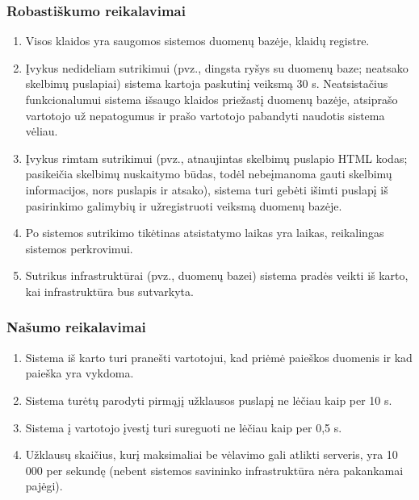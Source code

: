 \documentclass[12pt]{article}
\begin{document}
	\subsubsection{Robastiškumo reikalavimai}
	\begin{enumerate}
		\item Visos klaidos yra saugomos sistemos duomenų bazėje, klaidų registre.
		\item Įvykus nedideliam sutrikimui (pvz., dingsta ryšys su duomenų baze; neatsako skelbimų puslapiai) sistema kartoja paskutinį veiksmą 30 s. Neatsistačius funkcionalumui sistema išsaugo klaidos priežastį duomenų bazėje, atsiprašo vartotojo už nepatogumus ir prašo vartotojo pabandyti naudotis sistema vėliau.
		\item Įvykus rimtam sutrikimui (pvz., atnaujintas skelbimų puslapio HTML kodas; pasikeičia skelbimų nuskaitymo būdas, todėl nebeįmanoma gauti skelbimų informacijos, nors puslapis ir atsako), sistema turi gebėti išimti puslapį iš pasirinkimo galimybių ir užregistruoti veiksmą duomenų bazėje.
		\item Po sistemos sutrikimo tikėtinas atsistatymo laikas yra laikas, reikalingas sistemos perkrovimui.
		\item Sutrikus infrastruktūrai (pvz., duomenų bazei) sistema pradės veikti iš karto, kai infrastruktūra bus sutvarkyta.
	\end{enumerate}	
	
	\subsubsection{Našumo reikalavimai}
	\begin{enumerate}
		\item Sistema iš karto turi pranešti vartotojui, kad priėmė paieškos duomenis ir kad paieška yra vykdoma.
		\item Sistema turėtų parodyti pirmąjį užklausos puslapį ne lėčiau kaip per 10 s.
		\item Sistema į vartotojo įvestį turi sureguoti ne lėčiau kaip per 0,5 s.
		\item Užklausų skaičius, kurį maksimaliai be vėlavimo gali atlikti serveris, yra 10 000 per sekundę (nebent sistemos savininko infrastruktūra nėra pakankamai pajėgi).
	\end{enumerate}
	
\end{document}

